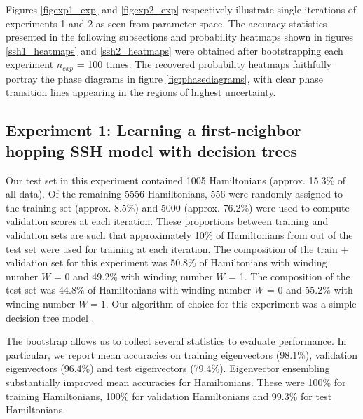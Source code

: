 \documentclass[fleqn,10pt]{wlscirep}
\begin{document}
Figures \ref{figexp1_exp} and \ref{figexp2_exp} respectively illustrate single iterations of experiments 1 and 2 as seen from parameter space. The accuracy statistics presented in the following subsections and probability heatmaps shown in figures \ref{ssh1_heatmaps} and \ref{ssh2_heatmaps} were obtained after bootstrapping each experiment $n_{exp}$ = 100 times. The recovered probability heatmaps faithfully portray the phase diagrams in figure \ref{fig:phasediagrams}, with clear phase transition lines appearing in the regions of highest uncertainty.

\subsection*{Experiment 1: Learning a first-neighbor hopping SSH model with decision trees}

Our test set in this experiment contained 1005 Hamiltonians (approx. 15.3\% of all data). Of the remaining 5556 Hamiltonians, 556 were randomly assigned to the training set (approx. 8.5\%) and 5000 (approx. 76.2\%) were used to compute validation scores at each iteration. These proportions between training and validation sets are such that approximately 10\%  of Hamiltonians from out of the test set were used for training at each iteration. The composition of the train + validation set for this experiment was 50.8\% of Hamiltonians with winding number $W$ = 0 and 49.2\% with winding number $W$ = 1. The composition of the test set was 44.8\% of Hamiltonians with winding number $W$ = 0 and 55.2\% with winding number $W=1$. Our algorithm of choice for this experiment was a simple decision tree model \cite{breiman2017classification}.

The bootstrap allows us to collect several statistics to evaluate performance. In particular, we report mean accuracies on training eigenvectors (98.1\%), validation eigenvectors (96.4\%) and test eigenvectors (79.4\%). Eigenvector ensembling substantially improved mean accuracies for Hamiltonians. These were 100\% for training Hamiltonians, 100\% for validation Hamiltonians and 99.3\% for test Hamiltonians.
\end{document}
